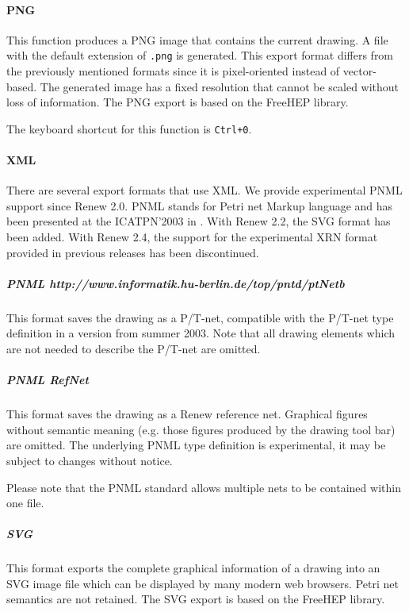 \paragraph{PNG}

This function produces a PNG image that contains the current drawing.
A file with the default extension of \texttt{.png} is generated.
This export format differs from the previously mentioned formats since it
is pixel-oriented instead of vector-based.
The generated image has a fixed resolution that cannot be scaled without
loss of information.
The PNG export is based on the FreeHEP library.

The keyboard shortcut for this function is \texttt{Ctrl+0}.

\paragraph{XML}\label{subsec:xmlexp}
There are several export formats that use XML.
We provide experimental PNML support since Renew 2.0.
PNML stands for Petri net Markup language and has been presented
at the ICATPN'2003 in \cite{Billington2003}.
With Renew 2.2, the SVG format has been added.
With Renew 2.4, the support for the experimental XRN format provided in
previous releases has been discontinued. 

\subparagraph{PNML http://www.informatik.hu-berlin.de/top/pntd/ptNetb}
This format saves the drawing as a P/T-net, compatible with the
P/T-net type definition in a version from summer 2003.
Note that all drawing elements which are not needed to describe
the P/T-net are omitted.

\subparagraph{PNML RefNet}
This format saves the drawing as a Renew reference net.
Graphical figures without semantic meaning (e.g. those figures
produced by the drawing tool bar) are omitted.
The underlying PNML type definition is experimental, it may be
subject to changes without notice.

Please note that the PNML standard allows multiple nets to be
contained within one file.


\subparagraph{SVG}
This format exports the complete graphical information of a drawing into an
SVG image file which can be displayed by many modern web browsers.
Petri net semantics are not retained.
The SVG export is based on the FreeHEP library.

